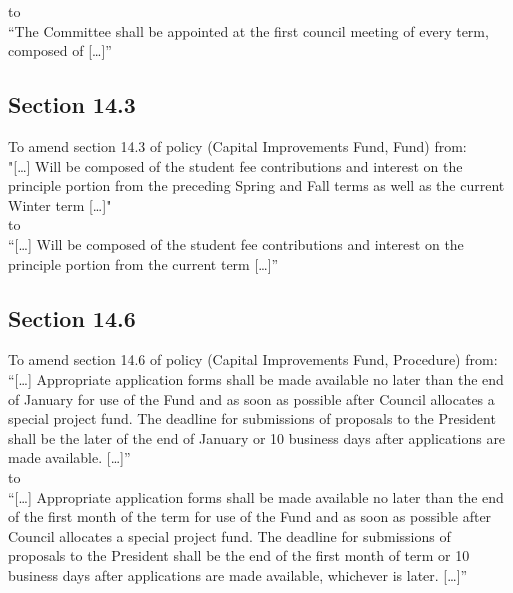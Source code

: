 \documentclass[12pt, letterpaper]{article}
\begin{document}
to\\

“The Committee shall be appointed at the first council meeting of every term, composed of […]”

\subsection*{Section 14.3}
To amend section 14.3 of policy (Capital Improvements Fund, Fund) from:\\

"[…] Will be composed of the student fee contributions and interest on the principle portion from the preceding Spring and Fall terms as well as the current Winter term […]"\\

to\\

“[…] Will be composed of the student fee contributions and interest on the principle portion from the current term […]”

\subsection*{Section 14.6}
To amend section 14.6 of policy (Capital Improvements Fund, Procedure) from:\\

“[…] Appropriate application forms shall be made available no later than the end of January for use of the Fund and as soon as possible after Council allocates a special project fund. The deadline for submissions of proposals to the President shall be the later of the end of January or 10 business days after applications are made available. […]”\\

to\\

“[…] Appropriate application forms shall be made available no later than the end of the first month of the term for use of the Fund and as soon as possible after Council allocates a special project fund. The deadline for submissions of proposals to the President shall be the end of the first month of term or 10 business days after applications are made available, whichever is later. […]”\\
\end{document}
